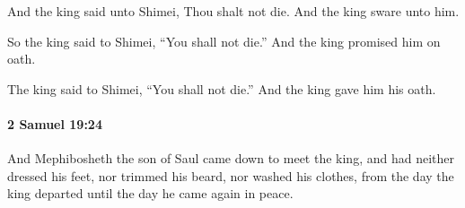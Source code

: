 			\begin{versebox}
					\item[BHS] 
					\item[ASV] And the king said unto Shimei, Thou shalt not die. And the king sware unto him.
					\item[NIV] So the king said to Shimei, “You shall not die.” And the king promised him on oath.
					\item[NRSV] The king said to Shimei, “You shall not die.” And the king gave him his oath.
			\end{versebox}

		\paragraph{2 Samuel 19:24} %
			\label{2SAMUEL-19-24}

			And Mephibosheth the son of Saul came down to meet the king, and had neither dressed his feet, nor trimmed his beard, nor washed his clothes, from the day the king departed until the day he came again in peace.

